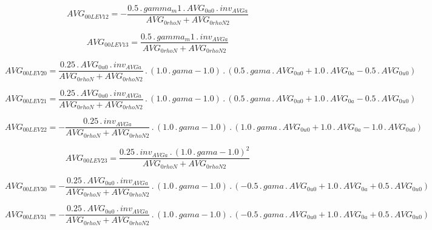 \documentclass{article}
\begin{document}
\begin{dmath}AVG_{0 0 LEV 12} = - \frac{0.5 \,.\, gamma_m1 \,.\, AVG_{0 u0} \,.\, inv_{AVG a}}{AVG_{0 rhoN} + AVG_{0 rhoN2}}\end{dmath}

\begin{dmath}AVG_{0 0 LEV 13} = \frac{0.5 \,.\, gamma_m1 \,.\, inv_{AVG a}}{AVG_{0 rhoN} + AVG_{0 rhoN2}}\end{dmath}

\begin{dmath}AVG_{0 0 LEV 20} = \frac{0.25 \,.\, AVG_{0 u0} \,.\, inv_{AVG a}}{AVG_{0 rhoN} + AVG_{0 rhoN2}} \,.\, \left(1.0 \,.\, gama - 1.0\right) \,.\, \left(0.5 \,.\, gama \,.\, AVG_{0 u0} + 1.0 \,.\, AVG_{0 a} - 0.5 \,.\, AVG_{0 
u0}\right)\end{dmath}

\begin{dmath}AVG_{0 0 LEV 21} = \frac{0.25 \,.\, AVG_{0 u0} \,.\, inv_{AVG a}}{AVG_{0 rhoN} + AVG_{0 rhoN2}} \,.\, \left(1.0 \,.\, gama - 1.0\right) \,.\, \left(0.5 \,.\, gama \,.\, AVG_{0 u0} + 1.0 \,.\, AVG_{0 a} - 0.5 \,.\, AVG_{0 
u0}\right)\end{dmath}

\begin{dmath}AVG_{0 0 LEV 22} = - \frac{0.25 \,.\, inv_{AVG a}}{AVG_{0 rhoN} + AVG_{0 rhoN2}} \,.\, \left(1.0 \,.\, gama - 1.0\right) \,.\, \left(1.0 \,.\, gama \,.\, AVG_{0 u0} + 1.0 \,.\, AVG_{0 a} - 1.0 \,.\, AVG_{0 u0}\right)\end{dmath}

\begin{dmath}AVG_{0 0 LEV 23} = \frac{0.25 \,.\, inv_{AVG a} \,.\, \left(1.0 \,.\, gama - 1.0 \right)^{2}}{AVG_{0 rhoN} + AVG_{0 rhoN2}}\end{dmath}

\begin{dmath}AVG_{0 0 LEV 30} = - \frac{0.25 \,.\, AVG_{0 u0} \,.\, inv_{AVG a}}{AVG_{0 rhoN} + AVG_{0 rhoN2}} \,.\, \left(1.0 \,.\, gama - 1.0\right) \,.\, \left(- 0.5 \,.\, gama \,.\, AVG_{0 u0} + 1.0 \,.\, AVG_{0 a} + 0.5 \,.\, AVG_{0 
u0}\right)\end{dmath}

\begin{dmath}AVG_{0 0 LEV 31} = - \frac{0.25 \,.\, AVG_{0 u0} \,.\, inv_{AVG a}}{AVG_{0 rhoN} + AVG_{0 rhoN2}} \,.\, \left(1.0 \,.\, gama - 1.0\right) \,.\, \left(- 0.5 \,.\, gama \,.\, AVG_{0 u0} + 1.0 \,.\, AVG_{0 a} + 0.5 \,.\, AVG_{0 
u0}\right)\end{dmath}
\end{document}
